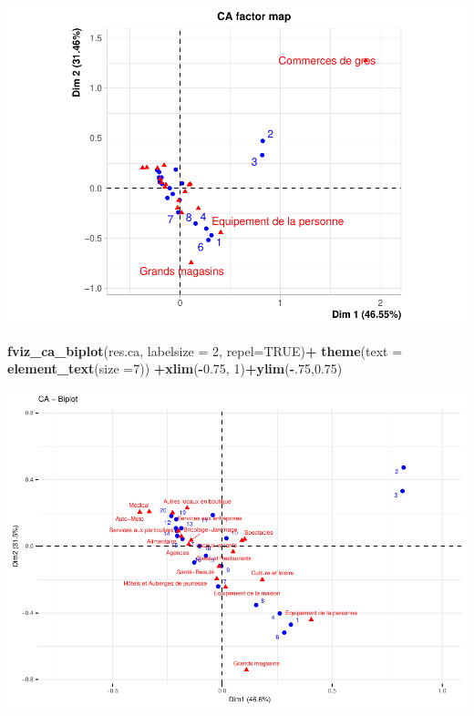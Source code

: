 \documentclass[
]{book}
\newenvironment{Shaded}{\begin{snugshade}}{\end{snugshade}}
\newcommand{\DataTypeTok}[1]{\textcolor[rgb]{0.13,0.29,0.53}{#1}}
\newcommand{\DecValTok}[1]{\textcolor[rgb]{0.00,0.00,0.81}{#1}}
\newcommand{\FloatTok}[1]{\textcolor[rgb]{0.00,0.00,0.81}{#1}}
\newcommand{\KeywordTok}[1]{\textcolor[rgb]{0.13,0.29,0.53}{\textbf{#1}}}
\newcommand{\NormalTok}[1]{#1}
\newcommand{\OperatorTok}[1]{\textcolor[rgb]{0.81,0.36,0.00}{\textbf{#1}}}
\newcommand{\OtherTok}[1]{\textcolor[rgb]{0.56,0.35,0.01}{#1}}
\newcommand{\StringTok}[1]{\textcolor[rgb]{0.31,0.60,0.02}{#1}}
\begin{document}
\includegraphics{bookdown-demo_files/figure-latex/0610-2.pdf}

\begin{Shaded}
\begin{Highlighting}[]
\KeywordTok{fviz_ca_biplot}\NormalTok{(res.ca, }\DataTypeTok{labelsize =} \DecValTok{2}\NormalTok{, }\DataTypeTok{repel=}\OtherTok{TRUE}\NormalTok{)}\OperatorTok{+}
\StringTok{  }\KeywordTok{theme}\NormalTok{(}\DataTypeTok{text =} \KeywordTok{element_text}\NormalTok{(}\DataTypeTok{size =}\DecValTok{7}\NormalTok{)) }\OperatorTok{+}\KeywordTok{xlim}\NormalTok{(}\OperatorTok{-}\FloatTok{0.75}\NormalTok{, }\DecValTok{1}\NormalTok{)}\OperatorTok{+}\KeywordTok{ylim}\NormalTok{(}\OperatorTok{-}\NormalTok{.}\DecValTok{75}\NormalTok{,}\FloatTok{0.75}\NormalTok{)}
\end{Highlighting}
\end{Shaded}

\includegraphics{bookdown-demo_files/figure-latex/0610-3.pdf}
\end{document}
